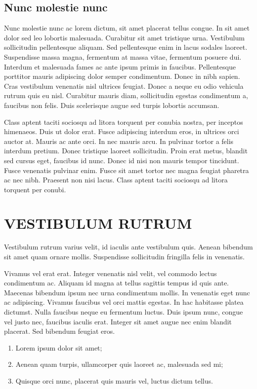 \documentclass[doutorado,rascunho]{fei}
\begin{document}
\section{Nunc molestie nunc}

Nunc molestie nunc ac lorem dictum, sit amet placerat tellus congue. In sit amet dolor sed leo lobortis malesuada. Curabitur sit amet tristique urna. Vestibulum sollicitudin pellentesque aliquam. Sed pellentesque enim in lacus sodales laoreet. Suspendisse massa magna, fermentum at massa vitae, fermentum posuere dui. Interdum et malesuada fames ac ante ipsum primis in faucibus. Pellentesque porttitor mauris adipiscing dolor semper condimentum. Donec in nibh sapien. Cras vestibulum venenatis nisl ultrices feugiat. Donec a neque eu odio vehicula rutrum quis eu nisl. Curabitur mauris diam, sollicitudin egestas condimentum a, faucibus non felis. Duis scelerisque augue sed turpis lobortis accumsan.

Class aptent taciti sociosqu ad litora torquent per conubia nostra, per inceptos himenaeos. Duis ut dolor erat. Fusce adipiscing interdum eros, in ultrices orci auctor at. Mauris ac ante orci. In nec mauris arcu. In pulvinar tortor a felis interdum pretium. Donec tristique laoreet sollicitudin. Proin erat metus, blandit sed cursus eget, faucibus id nunc. Donec id nisi non mauris tempor tincidunt. Fusce venenatis pulvinar enim. Fusce sit amet tortor nec magna feugiat pharetra ac nec nibh. Praesent non nisi lacus. Class aptent taciti sociosqu ad litora torquent per conubi.

\chapter{VESTIBULUM RUTRUM}

Vestibulum rutrum varius velit, id iaculis ante vestibulum quis. Aenean bibendum sit amet quam ornare mollis. Suspendisse sollicitudin fringilla felis in venenatis.

Vivamus vel erat erat. Integer venenatis nisl velit, vel commodo lectus condimentum ac. Aliquam id magna at tellus sagittis tempus id quis ante. Maecenas bibendum ipsum nec urna condimentum mollis. In venenatis eget nunc ac adipiscing. Vivamus faucibus vel orci mattis egestas. In hac habitasse platea dictumst. Nulla faucibus neque eu fermentum luctus. Duis ipsum nunc, congue vel justo nec, faucibus iaculis erat. Integer sit amet augue nec enim blandit placerat. Sed bibendum feugiat eros.

\begin{enumerate}
	\item Lorem ipsum dolor sit amet;
	\item Aenean quam turpis, ullamcorper quis laoreet ac, malesuada sed mi;
	\item Quisque orci nunc, placerat quis mauris vel, luctus dictum tellus.
\end{enumerate}
\end{document}
